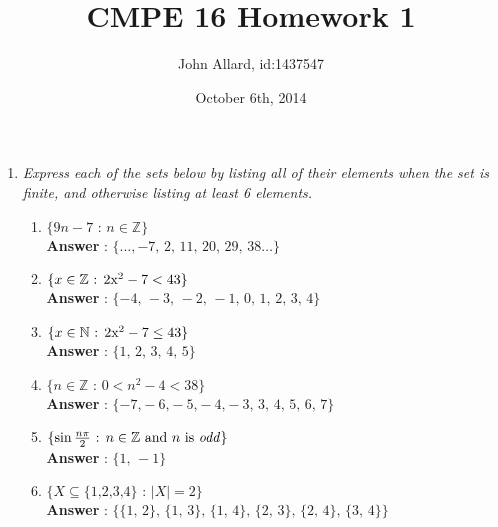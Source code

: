 \documentclass[a4paper,11pt]{article}
\title{ CMPE 16 Homework 1}
\author{John Allard, id:1437547}
\date{October 6th, 2014}
\begin{document}
\maketitle

\begin{enumerate}

\item \emph{Express each of the sets below by listing all of their elements when the set is finite, and otherwise listing at least 6 elements.}

  \begin{enumerate}
  \item \( \lbrace 9n - 7\text{ : }n \in \mathbb{Z}  \rbrace \) \\
  \textbf{Answer} : \( \lbrace \ldots, -7 \text{, } 2 \text{, } 11 \text{, } 20 \text{, } 29 \text{, } 38 \ldots\rbrace \) 
  \item \( \lbrace x \in \mathbb{Z} \text{ : } 2$x$^2-7 < 43 \rbrace \) \\
  \textbf{Answer} : \( \lbrace -4 \text{, } -3 \text{, } -2 \text{, } -1 \text{, } 0 \text{, } 1 \text{, } 2 \text{, } 3 \text{, } 4  \rbrace \) 
  \item \( \lbrace x \in \mathbb{N} \text{ : } 2$x$^2-7 \leq 43 \rbrace \) \\
  \textbf{Answer} : \( \lbrace 1 \text{, } 2 \text{, } 3 \text{, } 4 \text{, } 5  \rbrace \) 
  \item \( \lbrace n \in \mathbb{Z} \text{ : } 0 < n^2 - 4 < 38 \rbrace \) \\
  \textbf{Answer} : \( \lbrace -7 \text{,} -6 \text{,} -5 \text{,} -4 \text{,} -3 \text{, } 3 \text{, } 4 \text{, } 5 \text{, } 6 \text{, } 7 \rbrace \) 
  \item \( \lbrace  \sin{\frac{n\pi}{2}} \text{ : } n \in \mathbb{Z} \text{ and $n$ is \emph{odd}} \rbrace \) \\
  \textbf{Answer} : \( \lbrace 1 \text{, } -1\rbrace \) 
  \item \( \lbrace  X \subseteq \lbrace 1 \text{,} 2 \text{,} 3 \text{,} 4 \rbrace \text{ : } \vert X \vert = 2 \rbrace \) \\
  \textbf{Answer} : \( \lbrace 
  \lbrace 1 \text{, } 2 \rbrace \text{, } 
  \lbrace 1 \text{, } 3 \rbrace \text{, } 
  \lbrace 1 \text{, } 4 \rbrace \text{, } 
  \lbrace 2 \text{, } 3 \rbrace \text{, } 
  \lbrace 2 \text{, } 4 \rbrace \text{, } 
  \lbrace 3 \text{, } 4 \rbrace
  \rbrace \) 


\end{enumerate}
\end{enumerate}
\end{document}
